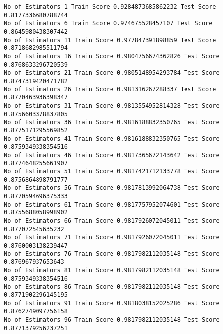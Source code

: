 \documentclass[11pt]{article}
\begin{document}
    \begin{Verbatim}[commandchars=\\\{\}]
No of Estimators 1 Train Score 0.9284873685862232 Test Score 0.8177336680788744
No of Estimators 6 Train Score 0.974675528457107 Test Score 0.8645980438307442
No of Estimators 11 Train Score 0.977847391898859 Test Score 0.8718682985511794
No of Estimators 16 Train Score 0.9804756674362826 Test Score 0.8768633296720539
No of Estimators 21 Train Score 0.9805148954293784 Test Score 0.8747319420471782
No of Estimators 26 Train Score 0.981316267288337 Test Score 0.8770463936398347
No of Estimators 31 Train Score 0.9813554952814328 Test Score 0.8756603378837805
No of Estimators 36 Train Score 0.9816188832350765 Test Score 0.8775171295569852
No of Estimators 41 Train Score 0.9816188832350765 Test Score 0.8759349338354516
No of Estimators 46 Train Score 0.9817365672143642 Test Score 0.8774648255661907
No of Estimators 51 Train Score 0.9817421712133778 Test Score 0.8756864898791777
No of Estimators 56 Train Score 0.9817813992064738 Test Score 0.8770594696375333
No of Estimators 61 Train Score 0.9817757952074601 Test Score 0.8755688058998902
No of Estimators 66 Train Score 0.9817926072045011 Test Score 0.877072545635232
No of Estimators 71 Train Score 0.9817926072045011 Test Score 0.8760003138239447
No of Estimators 76 Train Score 0.9817982112035148 Test Score 0.876967937653643
No of Estimators 81 Train Score 0.9817982112035148 Test Score 0.8759349338354516
No of Estimators 86 Train Score 0.9817982112035148 Test Score 0.8771902296145195
No of Estimators 91 Train Score 0.9818038152025286 Test Score 0.8762749097756158
No of Estimators 96 Train Score 0.9817982112035148 Test Score 0.8771379256237251

    \end{Verbatim}
\end{document}
